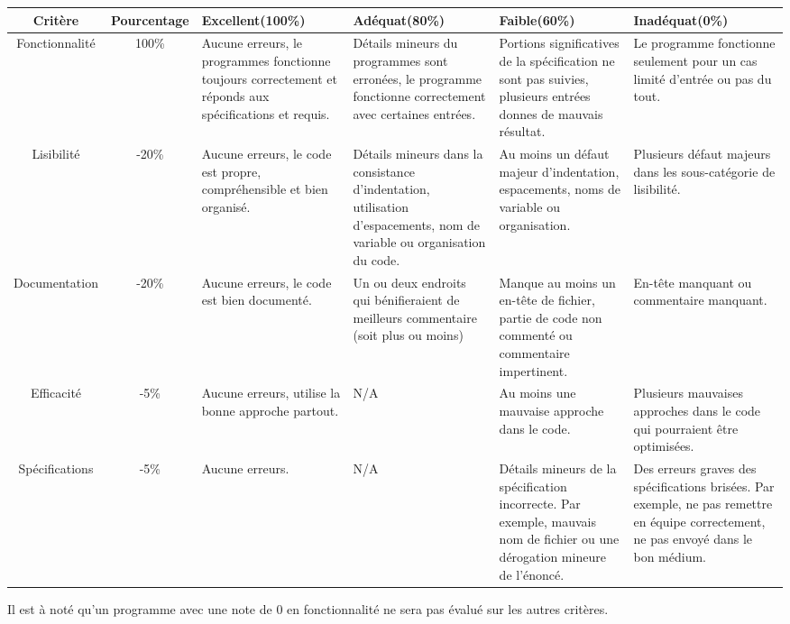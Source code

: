 \begin{adjustbox}{width=0.9\paperwidth,center}
    \def\tabularxcolumn#1{m{#1}}
\begin{tabularx}{0.9\paperwidth}{ |c||c|X|X|X|X| } \hline
    Critère & Pourcentage &  Excellent(100\%) & Adéquat(80\%) & Faible(60\%) & Inadéquat(0\%) \\ \hline \hline
    Fonctionnalité & 100\% & Aucune erreurs, le programmes fonctionne toujours correctement et réponds aux spécifications et requis. & Détails mineurs du programmes sont erronées, le programme fonctionne correctement avec certaines entrées. & Portions significatives de la spécification ne sont pas suivies, plusieurs entrées donnes de mauvais résultat. & Le programme fonctionne seulement pour un cas limité d'entrée ou pas du tout. \\ \hline
    Lisibilité & -20\% & Aucune erreurs, le code est propre, compréhensible et bien organisé. & Détails mineurs dans la consistance d'indentation, utilisation d'espacements, nom de variable ou organisation du code. & Au moins un défaut majeur d'indentation, espacements, noms de variable ou organisation. & Plusieurs défaut majeurs dans les sous-catégorie de lisibilité. \\ \hline
    Documentation & -20\% & Aucune erreurs, le code est bien documenté. & Un ou deux endroits qui bénifieraient de meilleurs commentaire (soit plus ou moins)
    & Manque au moins un en-tête de fichier, partie de code non commenté ou commentaire impertinent. & En-tête manquant ou commentaire manquant. \\ \hline
    Efficacité & -5\% & Aucune erreurs, utilise la bonne approche partout. & N/A & Au moins une mauvaise approche dans le code. & Plusieurs mauvaises approches dans le code qui pourraient être optimisées. \\ \hline
    Spécifications & -5\% & Aucune erreurs. & N/A & Détails mineurs de la spécification incorrecte. Par exemple, mauvais nom de fichier ou une dérogation mineure de l'énoncé. & Des erreurs graves des spécifications brisées. Par exemple, ne pas remettre en équipe correctement, ne pas envoyé dans le bon médium. \\ \hline
\end{tabularx}
\end{adjustbox}
Il est à noté qu'un programme avec une note de 0 en fonctionnalité ne sera pas évalué sur les autres critères.